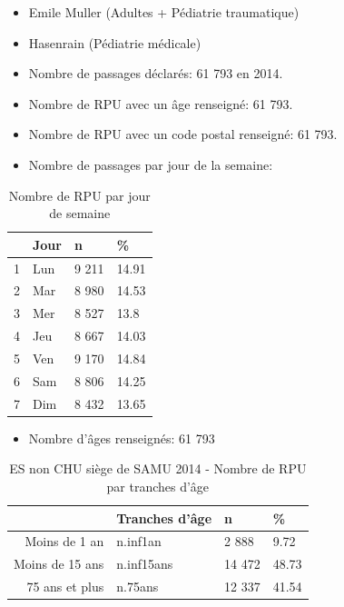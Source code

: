 \documentclass[]{article}
\begin{document}
\begin{itemize}
\item
  Emile Muller (Adultes + Pédiatrie traumatique)
\item
  Hasenrain (Pédiatrie médicale)
\item
  Nombre de passages déclarés: 61 793 en 2014.
\item
  Nombre de RPU avec un âge renseigné: 61 793.
\item
  Nombre de RPU avec un code postal renseigné: 61 793.
\item
  Nombre de passages par jour de la semaine:
\end{itemize}

\begin{table}[ht]
\centering
\begin{tabular}{rlll}
  \hline
 & Jour & n & \% \\ 
  \hline
1 & Lun & 9 211 & 14.91 \\ 
  2 & Mar & 8 980 & 14.53 \\ 
  3 & Mer & 8 527 & 13.8 \\ 
  4 & Jeu & 8 667 & 14.03 \\ 
  5 & Ven & 9 170 & 14.84 \\ 
  6 & Sam & 8 806 & 14.25 \\ 
  7 & Dim & 8 432 & 13.65 \\ 
   \hline
\end{tabular}
\caption{Nombre de RPU par jour de semaine} 
\end{table}

\begin{itemize}
\itemsep1pt\parskip0pt
\item
  Nombre d'âges renseignés: 61 793
\end{itemize}

\begin{table}[ht]
\centering
\begin{tabular}{rlll}
  \hline
 & Tranches d'âge & n & \% \\ 
  \hline
Moins de 1 an & n.inf1an &  2 888 & 9.72 \\ 
  Moins de 15 ans & n.inf15ans & 14 472 & 48.73 \\ 
  75 ans et plus & n.75ans & 12 337 & 41.54 \\ 
   \hline
\end{tabular}
\caption{ES non CHU siège de SAMU 2014 - Nombre de RPU par tranches d'âge} 
\end{table}
\end{document}
